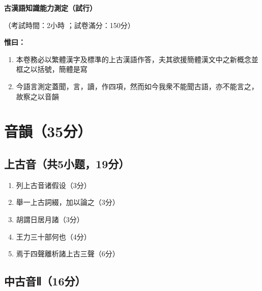\documentclass[12pt,a4paper]{article}
\begin{document}
\begin{center}
    \LARGE\textbf{古漢語知識能力測定（試行）}
    
    \vspace{1em}
    
    \large（考試時間：2小時 ；試卷滿分：150分）
\end{center}

\vspace{2em}

\noindent\textbf{惟曰：}
\begin{enumerate}[leftmargin=*, itemsep=0.5ex]
    \item 本卷務必以繁體漢字及標準的上古漢語作答，夫其欲援簡體漢文中之新概念並框之以括號，簡體是寫
    \item 今語言測定蓋聞，言，讀，作四項，然而如今我衆不能聞古語，亦不能言之，故察之以音韻
\end{enumerate}

\vspace{2em}

\section{音韻（35分）}

\subsection{上古音（共5小题，19分）}

\vspace{1em}

\begin{enumerate}[leftmargin=*, label=\textbf{\arabic*.}]
    \item 列上古音诸假设（3分）
    

    \item 舉一上古詞綴，加以論之（3分）
    
   
    \item 胡謂日居月諸（3分）
 
    
    \item 王力三十部何也（4分）
    
    \vspace{8em}
    
    \item 焉于四聲離析諸上古三聲（6分）
    
    \vspace{10em}
\end{enumerate}

\subsection{中古音Ⅱ（16分）}
\end{document}

